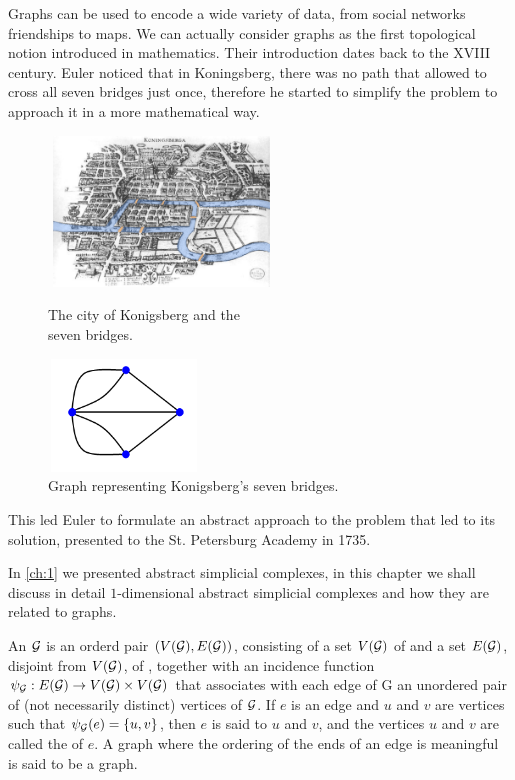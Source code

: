 \documentclass[../2.tex]{subfiles}
\begin{document}
    Graphs can be used to encode a wide variety of data, from social networks friendships to maps.    
    We can actually consider graphs as the first topological notion introduced in mathematics.
    Their introduction dates back to the XVIII century.
    Euler noticed that in Koningsberg, there was no path that 
    allowed to cross all seven bridges just once, therefore he started to simplify the problem to approach it in a more mathematical 
    way.
    \begin{figure}[H]
        \begin{minipage}{.5\textwidth}
            \centering
            \includegraphics[width=6cm, height=4cm]{sections/2/Bridge}
            \caption{The city of Konigsberg and the\\ seven bridges.}
            \label{fig:2:1}
        \end{minipage}
        \begin{minipage}{.5\textwidth}
            \centering
            \includegraphics[width=4cm, height=3cm]{sections/2/kgraph}
            \caption{Graph representing Konigsberg's seven bridges.}
            \label{fig:2:2}
        \end{minipage}
    \end{figure}

    This led Euler to formulate an abstract approach to the problem that led to its solution, presented to the St. Petersburg
    Academy in 1735.

    In \autoref{ch:1} we presented abstract simplicial complexes, in this chapter we shall discuss in detail
    $1$-dimensional abstract simplicial complexes and how they are related to graphs.

    \begin{defn}
        An  $\mathcal{G}$ is an orderd pair $(V(\mathcal{G}),E(\mathcal{G}))$, consisting of a set $V(\mathcal{G})$ of 
        and a set $E(\mathcal{G})$, disjoint from $V(\mathcal{G})$, of , together with an incidence function
        $\psi_{\mathcal{G}}:E(\mathcal{G}) \to V(\mathcal{G}) \times V(\mathcal{G})$ that associates with each edge of G an unordered pair of (not necessarily
        distinct) vertices of $\mathcal{G}$. If $e$ is an edge and $u$ and $v$ are vertices such that $\psi_{\mathcal{G}}(e) =
        \{u, v\}$, then $e$ is said to  $u$ and $v$, and the vertices $u$ and $v$ are called the 
        of $e$. A graph where the ordering of the ends of an edge is meaningful is said to be a  graph.
    \end{defn}
\end{document}
